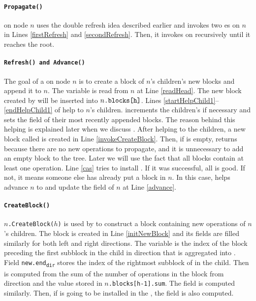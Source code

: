 \paragraph{\tt{Propagate()}}
 on node $n$ uses the double refresh idea described
earlier and invokes two es on $n$ in Lines
\ref{firstRefresh} and \ref{secondRefresh}. Then, it invokes
 on  recursively until it reaches the
root.  

\paragraph{\tt{Refresh()} and \tt{Advance()}}
The goal of a  on node $n$ is to create a block of $n$'s
children's new blocks and append it to $n$. The variable
 is read from $n$ at Line \ref{readHead}. The new
block created by  will be inserted into
$n{\normalfont{\texttt{.blocks[h]}}}$. Lines \ref{startHelpChild1}--\ref{endHelpChild1}
of  help to  $n$'s children. 
increments the children's  if necessary and sets the
 field of their most recently appended blocks. The reason
behind this helping is explained later when we discuss
. After helping to  the children, a new
block called  is created in Line
\ref{invokeCreateBlock}. Then, if  is empty, 
returns  because there are no new operations to propagate,
and it is unnecessary to add an empty block to the tree. Later we will
use the fact that all blocks contain at least one operation. Line
\ref{cas} tries to install . If it was successful, all is
good. If not, it means someone else has already put a block in
$n$. In this case,  helps advance
$n$ to  and update the  field of
$n$ at Line \ref{advance}. 


\paragraph{\tt{CreateBlock()}} \texttt{$n$.CreateBlock($h$)} is used
by  to construct a block containing new operations of
$n$'s children. 
The block  is created in Line \ref{initNewBlock} and its
fields are filled similarly for both left and right directions. The
variable   is the index of the block preceding the
first subblock in the child in direction  that is aggregated
into . Field \texttt{new.end\textsubscript{dir}} stores the
index of the rightmost subblock of  in the child. Then
 is computed from the sum of the number of
 operations in the  block from direction 
and the value stored in \texttt{$n$.blocks[h-1].sum}. The
field  is computed similarly. Then, if 
is going to be installed in the , the  field is also
computed. 

